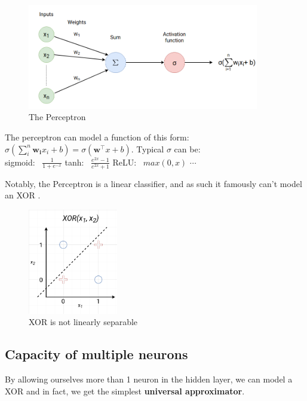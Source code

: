 \documentclass{article}
\begin{document}
\begin{figure}[H]
    \centering
    \includegraphics[width=0.9\textwidth]{figures/perceptron.png}
    \caption{The Perceptron}
\end{figure}


The perceptron can model a function of this form: $\sigma(\sum_i^{n} \mathbf{w_i} x_i +b) = \sigma(\mathbf{w}^\top x + b)$. Typical $\sigma$ can be: \\
sigmoid: \ $\frac{1}{1+e^{-x}}$ \quad \quad \quad
tanh: \ $\frac{e^{2x}-1}{e^{2x}+1}$ \quad \quad \quad
ReLU: \ $max(0, x)$ \quad \quad $\cdots$

Notably, the Perceptron is a linear classifier, and as such it famously can't model an XOR \cite{Minskyetal1969}. \\

\begin{figure}[H]
    \centering
    \includegraphics[width=0.35\textwidth]{figures/xor_non_linsep.png}
    \caption{XOR is not linearly separable}
\end{figure}

\subsection{Capacity of multiple neurons}
By allowing ourselves more than 1 neuron in the hidden layer, we can model a XOR and in fact, we get the simplest \textbf{universal approximator}.
\end{document}
